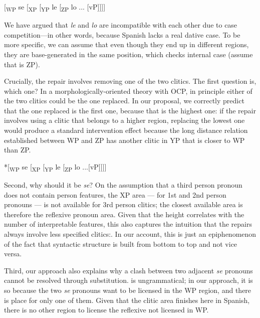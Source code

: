 \documentclass[output=paper,modfonts,nonflat,newtxmath,colorlinks,citecolor=brown]{langsci/langscibook}
\begin{document}
\ea  %
   {[}\textsubscript{WP}  se  [\textsubscript{XP}  [\textsubscript{YP}  le  [\textsubscript{ZP}  lo ... [vP]{]]]} 
   
    \label{ex:cabre:23}
    \z

       

We have argued that \textit{le} and \textit{lo} are incompatible with each other due to case competition—in other words, because Spanish lacks a real dative case. To be more specific, we can assume that even though they end up in different regions, they are base-generated in the same position, which checks internal case (assume that is ZP). 

Crucially, the repair involves removing one of the two clitics. The first question is, which one? In a morphologically-oriented theory with OCP, in principle either of the two clitics could be the one replaced. In our proposal, we correctly predict that the one replaced is the first one, because that is the highest one: if the repair involves using a clitic that belongs to a higher region, replacing the lowest one would produce a standard intervention effect because the long distance relation established between WP and ZP has another clitic in YP that is closer to WP than ZP.

\ea%
    \label{ex:cabre:24}
    *[\textsubscript{WP}   se  [\textsubscript{XP}  [\textsubscript{YP}  le  [\textsubscript{ZP}  lo ...[vP]]]]
   
    \z

         
Second, why should it be \textit{se}? On the assumption that a third person pronoun does not contain person features, the XP area — for 1st and 2nd person pronouns — is not available for 3rd person clitics; the closest available area is therefore the reflexive pronoun area. Given that the height correlates with the number of interpretable features, this also captures the intuition that the repairs always involve less specified clitics:. In our account, this is just an epiphenomenon of the fact that syntactic structure is built from bottom to top and not vice versa.

Third, our approach also explains why a clash between two adjacent \textit{se} pronouns cannot be resolved through substitution.  is ungrammatical; in our approach, it is so because the two \textit{se} pronouns want to be licensed in the WP region, and there is place for only one of them. Given that the clitic area finishes here in Spanish, there is no other region to license the reflexive not licensed in WP.
\end{document}
